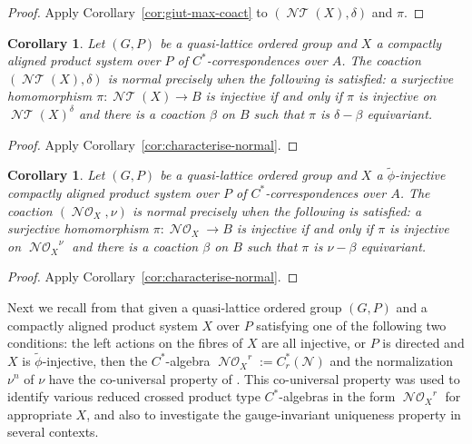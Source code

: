 \documentclass[12pt]{amsart}
\theoremstyle{plain}
\newtheorem{cor}[theorem]{Corollary}
\theoremstyle{remark}
\theoremstyle{definition}
\numberwithin{equation}{section}
\theoremstyle{plain}
\theoremstyle{definition}
\theoremstyle{remark}
\begin{document}
 \begin{proof}
 Apply Corollary~\ref{cor:giut-max-coact} to $({\operatorname{\mathcal{NT}}}(X),\delta)$ and $\pi$.
 \end{proof}

\begin{cor}
\label{thm:giut-Tcov}
Let $(G,P)$ be a quasi-lattice ordered group
 and  $X$ a compactly aligned product system over $P$ of $C^*$-correspondences over $A$. The coaction $({\operatorname{\mathcal{NT}}}(X), \delta)$
 is normal precisely when the following is satisfied: a surjective homomorphism $\pi:{\operatorname{\mathcal{NT}}}(X)\to B$ is injective
 if and only if $\pi$ is injective on ${\operatorname{\mathcal{NT}}}(X)^\delta$ and
 there is a coaction $\beta$ on $B$ such that $\pi$ is $\delta-\beta$ equivariant.
 \end{cor}

\begin{proof} Apply Corollary~\ref{cor:characterise-normal}.
\end{proof}

\begin{cor} Let $(G,P)$ be a quasi-lattice ordered group
 and $X$ a $\tilde\phi$-injective compactly aligned product system over $P$ of $C^*$-correspondences over $A$. The
 coaction $({\operatorname{\mathcal{NO}}_{\!{X}}}, \nu)$ is normal precisely when the following is satisfied: a surjective homomorphism $\pi:{\operatorname{\mathcal{NO}}_{\!{X}}}\to B$ is injective
 if and only if $\pi$ is injective on ${\operatorname{\mathcal{NO}}_{\!{X}}}^\nu$ and
 there is a coaction $\beta$ on $B$ such that $\pi$ is $\nu-\beta$ equivariant.
\end{cor}

\begin{proof} Apply Corollary~\ref{cor:characterise-normal}.
\end{proof}

Next we recall from \cite{CLSV} that given
 a quasi-lattice ordered group $(G, P)$ and a compactly aligned product system $X$ over $P$ satisfying one of the following two conditions: the
left actions on the fibres of $X$ are all injective, or $P$ is directed and $X$ is $\tilde\phi$-injective, then the
$C^*$-algebra ${\operatorname{\mathcal{NO}}_{\!{X}}}^{r}:=C_r^*(\mathcal{N})$ and the normalization $\nu^n$ of $\nu$
have the co-universal property of \cite[Theorem 4.1]{CLSV}. This co-universal property was used to identify various
reduced crossed product type $C^*$-algebras in the form ${\operatorname{\mathcal{NO}}_{\!{X}}}^{r}$ for appropriate $X$, and also to investigate the
gauge-invariant uniqueness property in several contexts.
\end{document}
